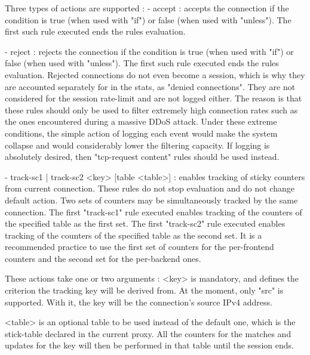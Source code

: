   Three types of actions are supported :
    - accept :
        accepts the connection if the condition is true (when used with "if")
        or false (when used with "unless"). The first such rule executed ends
        the rules evaluation.

    - reject :
        rejects the connection if the condition is true (when used with "if")
        or false (when used with "unless"). The first such rule executed ends
        the rules evaluation. Rejected connections do not even become a
        session, which is why they are accounted separately for in the stats,
        as "denied connections". They are not considered for the session
        rate-limit and are not logged either. The reason is that these rules
        should only be used to filter extremely high connection rates such as
        the ones encountered during a massive DDoS attack. Under these extreme
        conditions, the simple action of logging each event would make the
        system collapse and would considerably lower the filtering capacity. If
        logging is absolutely desired, then "tcp-request content" rules should
        be used instead.

    - { track-sc1 | track-sc2 } <key> [table <table>] :
        enables tracking of sticky counters from current connection. These
        rules do not stop evaluation and do not change default action. Two sets
        of counters may be simultaneously tracked by the same connection. The
        first "track-sc1" rule executed enables tracking of the counters of the
        specified table as the first set. The first "track-sc2" rule executed
        enables tracking of the counters of the specified table as the second
        set. It is a recommended practice to use the first set of counters for
        the per-frontend counters and the second set for the per-backend ones.

        These actions take one or two arguments :
          <key>   is mandatory, and defines the criterion the tracking key will
                  be derived from. At the moment, only "src" is supported. With
                  it, the key will be the connection's source IPv4 address.

         <table>  is an optional table to be used instead of the default one,
                  which is the stick-table declared in the current proxy. All
                  the counters for the matches and updates for the key will
                  then be performed in that table until the session ends.


